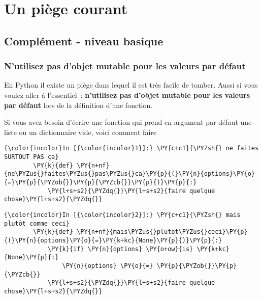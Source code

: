     
    
    
    

    

    \hypertarget{un-piuxe8ge-courant}{%
\section{Un piège courant}\label{un-piuxe8ge-courant}}

    \hypertarget{compluxe9ment---niveau-basique}{%
\subsection{Complément - niveau
basique}\label{compluxe9ment---niveau-basique}}

    \hypertarget{nutilisez-pas-dobjet-mutable-pour-les-valeurs-par-duxe9faut}{%
\subsubsection{N'utilisez pas d'objet mutable pour les valeurs par
défaut}\label{nutilisez-pas-dobjet-mutable-pour-les-valeurs-par-duxe9faut}}

    En Python il existe un piège dans lequel il est très facile de tomber.
Aussi si vous voulez aller à l'essentiel~: \textbf{n'utilisez pas
d'objet mutable pour les valeurs par défaut} lors de la définition d'une
fonction.

Si vous avez besoin d'écrire une fonction qui prend en argument par
défaut une liste ou un dictionnaire vide, voici comment faire

    \begin{Verbatim}[commandchars=\\\{\},frame=single,framerule=0.3mm,rulecolor=\color{cellframecolor}]
{\color{incolor}In [{\color{incolor}1}]:} \PY{c+c1}{\PYZsh{} ne faites SURTOUT PAS ça}
        \PY{k}{def} \PY{n+nf}{ne\PYZus{}faites\PYZus{}pas\PYZus{}ca}\PY{p}{(}\PY{n}{options}\PY{o}{=}\PY{p}{\PYZob{}}\PY{p}{\PYZcb{}}\PY{p}{)}\PY{p}{:}
            \PY{l+s+s2}{\PYZdq{}}\PY{l+s+s2}{faire quelque chose}\PY{l+s+s2}{\PYZdq{}}
\end{Verbatim}


    \begin{Verbatim}[commandchars=\\\{\},frame=single,framerule=0.3mm,rulecolor=\color{cellframecolor}]
{\color{incolor}In [{\color{incolor}2}]:} \PY{c+c1}{\PYZsh{} mais plutôt comme ceci}
        \PY{k}{def} \PY{n+nf}{mais\PYZus{}plutot\PYZus{}ceci}\PY{p}{(}\PY{n}{options}\PY{o}{=}\PY{k+kc}{None}\PY{p}{)}\PY{p}{:}
            \PY{k}{if} \PY{n}{options} \PY{o+ow}{is} \PY{k+kc}{None}\PY{p}{:} 
                \PY{n}{options} \PY{o}{=} \PY{p}{\PYZob{}}\PY{p}{\PYZcb{}}
            \PY{l+s+s2}{\PYZdq{}}\PY{l+s+s2}{faire quelque chose}\PY{l+s+s2}{\PYZdq{}}
\end{Verbatim}


